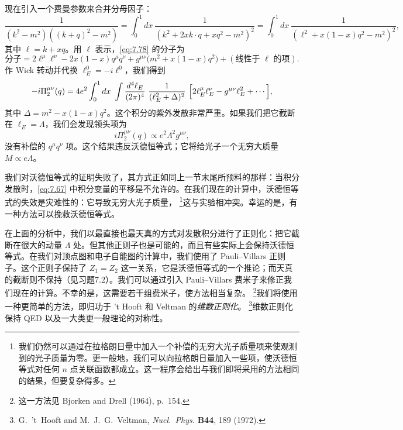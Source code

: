 现在引入一个费曼参数来合并分母因子：
\begin{equation}
  \frac{1}{(k^2-m^2)((k+q)^2-m^2)}
  = \int_0^1 dx\ \frac{1}{(k^2 + 2xk\cdot q + xq^2 - m^2)^2}
  = \int_0^1 dx\ \frac{1}{(\ell^2 + x(1-x)q^2 - m^2)^2},
\end{equation}
其中 $\ell = k + xq$。用 $\ell$ 表示，\eqref{eq:7.78} 的分子为
\begin{equation}
  \text{分子} = 2\ell^\mu\ell^\nu - 2x(1-x)q^\mu q^\nu
    + g^{\mu\nu}\bigl( m^2 + x(1-x)q^2 \bigr)
    + (\text{线性于 } \ell \text{ 的项}) .
\end{equation}
作 Wick 转动并代换 $\ell_E^0 = -i\ell^0$，我们得到
\begin{equation}
  -i\Pi^{\mu\nu}_2(q) = 4e^2 \int_0^1 dx\ \int
    \frac{d^4\ell_E}{(2\pi)^4}\ \frac{1}{(\ell_E^2+\Delta)^2}\
    \Bigl[ 2\ell_E^\mu\ell_E^\nu - g^{\mu\nu}\ell_E^2 + \cdots \Bigr],
  \label{eq:7.79}
\end{equation}
其中 $\Delta = m^2 - x(1-x)q^2$。这个积分的紫外发散非常严重。如果我们把它截断在 $\ell_E = \Lambda$，我们会发现领头项为
\begin{equation}
  i\Pi^{\mu\nu}_2(q) \propto e^2\Lambda^2 g^{\mu\nu},
\end{equation}
没有补偿的 $q^\mu q^\nu$ 项。这个结果违反沃德恒等式；它将给光子一个无穷大质量 $M \propto e\Lambda$。

我们对沃德恒等式的证明失败了，其方式正如同上一节末尾所预料的那样：当积分发散时，\eqref{eq:7.67} 中积分变量的平移是不允许的。在我们现在的计算中，沃德恒等式的失效是灾难性的：它导致无穷大光子质量，%
\footnote{我们仍然可以通过在拉格朗日量中加入一个补偿的无穷大光子质量项来使观测到的光子质量为零。更一般地，我们可以向拉格朗日量加入一些项，使沃德恒等式对任何 $n$ 点关联函数都成立。这一程序会给出与我们即将采用的方法相同的结果，但要复杂得多。}这与实验相冲突。幸运的是，有一种方法可以挽救沃德恒等式。

在上面的分析中，我们以最直接也最天真的方式对发散积分进行了正则化：把它截断在很大的动量 $\Lambda$ 处。但其他正则子也是可能的，而且有些实际上会保持沃德恒等式。在我们对顶点图和电子自能图的计算中，我们使用了 Pauli--Villars 正则子。这个正则子保持了 $Z_1 = Z_2$ 这一关系，它是沃德恒等式的一个推论；而天真的截断则不保持（见习题7.2）。我们可以通过引入 Pauli--Villars 费米子来修正我们现在的计算。不幸的是，这需要若干组费米子，使方法相当复杂。%
\footnote{这一方法见 Bjorken and Drell (1964), p.~154.}我们将使用一种更简单的方法，即归功于 't Hooft 和 Veltman 的\emph{维数正则化}。%
\footnote{G.~'t~Hooft and M.~J.~G.~Veltman, \emph{Nucl.\ Phys.} \textbf{B44}, 189 (1972).}维数正则化保持 QED 以及一大类更一般理论的对称性。

